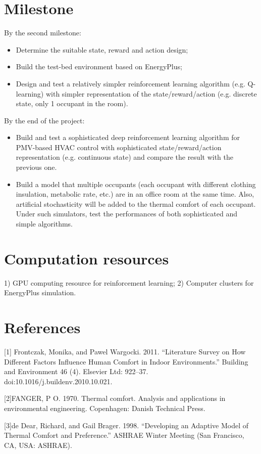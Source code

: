 \documentclass{article}
\begin{document}
\section{Milestone}
By the second milestone:
\begin{itemize}
\item
Determine the suitable state, reward and action design;
\item
Build the test-bed environment based on EnergyPlus;
\item
Design and test a relatively simpler reinforcement learning algorithm (e.g. Q-learning) with simpler representation of the state/reward/action (e.g. discrete state, only 1 occupant in the room).
\end{itemize}
By the end of the project:
\begin{itemize}
\item
Build and test a sophisticated deep reinforcement learning algorithm for PMV-based HVAC control with sophisticated state/reward/action representation (e.g. continuous state) and compare the result with the previous one. 
\item
Build a model that multiple occupants (each occupant with different clothing insulation, metabolic rate, etc.) are in an office room at the same time. Also, artificial stochasticity will be added to the thermal comfort of each occupant. Under such simulators, test the performances of both sophisticated and simple algorithms. 
\end{itemize}
\section{Computation resources}
1) GPU computing resource for reinforcement learning; 2) Computer clusters for EnergyPlus simulation. 
\section*{References}

[1] Frontczak, Monika, and Pawel Wargocki. 2011. “Literature Survey on How Different Factors Influence Human Comfort in Indoor Environments.” Building and Environment 46 (4). Elsevier Ltd: 922–37. doi:10.1016/j.buildenv.2010.10.021.

[2]FANGER, P O. 1970. Thermal comfort. Analysis and applications in environmental engineering. Copenhagen: Danish Technical Press.

[3]de Dear, Richard, and Gail Brager. 1998. “Developing an Adaptive Model of Thermal Comfort and Preference.” ASHRAE Winter Meeting (San Francisco, CA, USA: ASHRAE).
\end{document}
